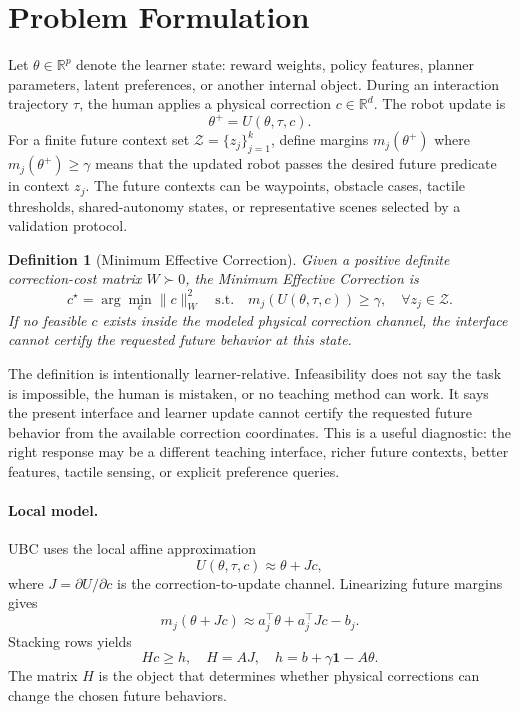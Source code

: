 \documentclass{article}
\newtheorem{definition}{Definition}
\newcommand{\R}{\mathbb{R}}
\begin{document}
\section{Problem Formulation}

Let $\theta\in\R^p$ denote the learner state: reward weights, policy features,
planner parameters, latent preferences, or another internal object. During an
interaction trajectory $\tau$, the human applies a physical correction
$c\in\R^d$. The robot update is
\begin{equation}
    \theta^+ = U(\theta,\tau,c).
\end{equation}
For a finite future context set $\mathcal{Z}=\{z_j\}_{j=1}^k$, define margins
$m_j(\theta^+)$ where $m_j(\theta^+)\ge \gamma$ means that the updated robot
passes the desired future predicate in context $z_j$. The future contexts can be
waypoints, obstacle cases, tactile thresholds, shared-autonomy states, or
representative scenes selected by a validation protocol.

\begin{definition}[Minimum Effective Correction]
Given a positive definite correction-cost matrix $W\succ0$, the Minimum
Effective Correction is
\begin{equation}
    c^\star =
    \arg\min_c \|c\|_W^2
    \quad \textrm{s.t.}\quad
    m_j(U(\theta,\tau,c))\ge \gamma,\quad \forall z_j\in\mathcal{Z}.
    \label{eq:mec}
\end{equation}
If no feasible $c$ exists inside the modeled physical correction channel, the
interface cannot certify the requested future behavior at this state.
\end{definition}

The definition is intentionally learner-relative. Infeasibility does not say the
task is impossible, the human is mistaken, or no teaching method can work. It
says the present interface and learner update cannot certify the requested
future behavior from the available correction coordinates. This is a useful
diagnostic: the right response may be a different teaching interface, richer
future contexts, better features, tactile sensing, or explicit preference
queries.

\paragraph{Local model.}
UBC uses the local affine approximation
\begin{equation}
    U(\theta,\tau,c) \approx \theta + Jc,
\end{equation}
where $J=\partial U/\partial c$ is the correction-to-update channel. Linearizing
future margins gives
\begin{equation}
    m_j(\theta+Jc) \approx a_j^\top \theta + a_j^\top Jc - b_j.
\end{equation}
Stacking rows yields
\begin{equation}
    Hc\ge h,\quad H=AJ,\quad h=b+\gamma\mathbf{1}-A\theta.
    \label{eq:channel}
\end{equation}
The matrix $H$ is the object that determines whether physical corrections can
change the chosen future behaviors.
\end{document}
